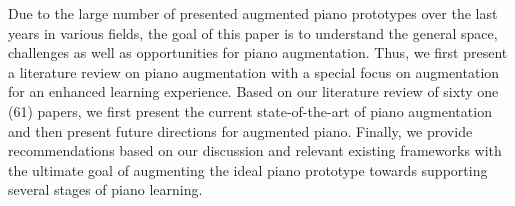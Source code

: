 \documentclass[sigconf, screen, review]{acmart}
\begin{document}
Due to the large number of presented augmented piano prototypes over the last years in various fields, the goal of this paper is to understand the general space, challenges as well as opportunities for piano augmentation. Thus, we first present a literature review on piano augmentation with a special focus on augmentation for an enhanced learning experience. Based on our literature review of sixty one (61) papers, we first present the current state-of-the-art of piano augmentation and then present future directions for augmented piano. Finally, we provide recommendations based on our discussion and relevant existing frameworks with the ultimate goal of augmenting the ideal piano prototype towards supporting several stages of piano learning. 
\end{document}
